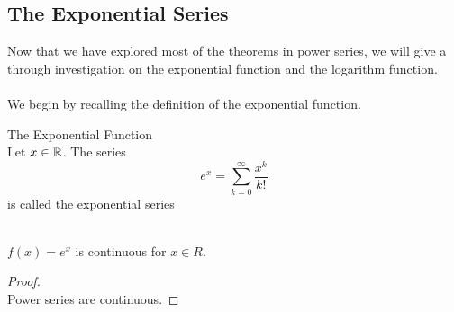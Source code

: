 \documentclass[a4paper]{article}
\begin{document}
\subsection{The Exponential Series}
Now that we have explored most of the theorems in power series, we will give a through investigation on the exponential function and the logarithm function. \\~\\
We begin by recalling the definition of the exponential function. 
\begin{defn}{The Exponential Function}{}\\ Let $x\in\mathbb{R}$. The series $$e^x=\sum_{k=0}^\infty \frac{x^k}{k!}$$ is called the exponential series
\end{defn}

\begin{thm}{}{}\\ $f(x)=e^x$ is continuous for $x\in R$. 
\begin{proof}\\ Power series are continuous. 
\end{proof}
\end{thm}
\end{document}
